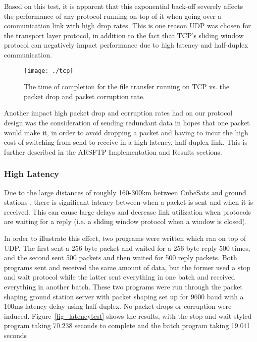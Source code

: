 \documentclass[journal]{./IEEEtran}
\begin{document}
Based on this test, it is apparent that this exponential back-off severely affects the performance of any protocol running on top of it when going over a communication link with high drop rates.  This is one reason UDP was chosen for the transport layer protocol, in addition to the fact that TCP's sliding window protocol can negatively impact performance due to high latency and half-duplex communication.

\begin{figure}[!h]
\begin{center}
\texttt{[image: ./tcp]}
\end{center}
\caption{The time of completion for the file transfer running on TCP vs. the packet drop and packet corruption rate.}
\label{fig_tcp}
\end{figure}

Another impact high packet drop and corruption rates had on our protocol design was the consideration of sending redundant data in hopes that one packet would make it, in order to avoid dropping a packet and having to incur the high cost of switching from send to receive in a high latency, half duplex link.  This is further described in the ARSFTP Implementation and Results sections.

\subsubsection{High Latency}

Due to the large distances of roughly 160-300km between CubeSats and ground stations \cite{BrownDeorbit}, there is significant latency between when a packet is sent and when it is received.  This can cause large delays and decrease link utilization when protocols are waiting for a reply (i.e. a sliding window protocol when a window is closed).  

In order to illustrate this effect, two programs were written which ran on top of UDP.  The first sent a 256 byte packet and waited for a 256 byte reply 500 times, and the second sent 500 packets and then waited for 500 reply packets.  Both programs sent and received the same amount of data, but the former used a stop and wait protocol while the latter sent everything in one batch and received everything in another batch.  These two programs were run through the packet shaping ground station server with packet shaping set up for 9600 baud with a 100ms latency delay using half-duplex.  No packet drops or corruption were induced.  Figure~\ref{fig_latencytest} shows the results, with the stop and wait styled program taking 70.238 seconds to complete and the batch program taking 19.041 seconds
\end{document}
